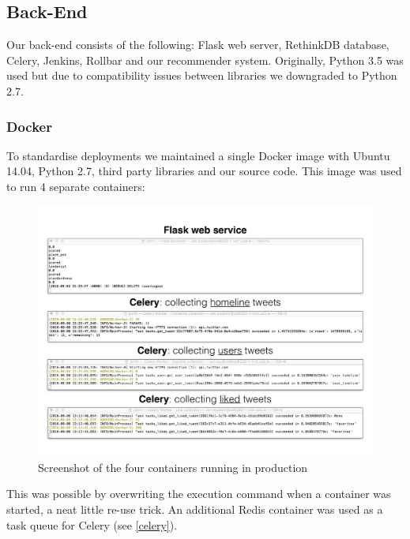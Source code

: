 \documentclass{article}
\begin{document}
\newpage


\subsection{Back-End} %
Our back-end consists of the following: Flask web server, RethinkDB database, Celery, Jenkins, Rollbar and our recommender system. Originally, Python 3.5 was used but due to compatibility issues between libraries we downgraded to Python 2.7.

\subsubsection*{Docker} %
To standardise deployments we maintained a single Docker image with Ubuntu 14.04, Python 2.7, third party libraries and our source code. This image was used to run 4 separate containers:

\begin{figure}[H]
    \centering
    \includegraphics[width=\textwidth,trim={0 1cm 0 1cm},clip]{4containers}
    \caption{Screenshot of the four containers running in production}
\end{figure}

\noindent This was possible by overwriting the execution command when a container was started, a neat little re-use trick. An additional Redis container was used as a task queue for Celery (see \ref{celery}).


\newpage
\end{document}
